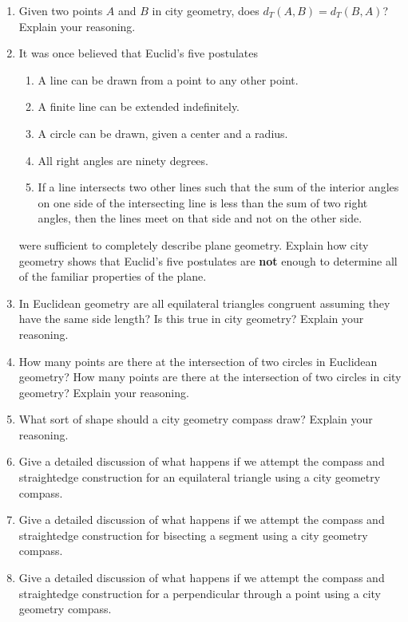 \begin{problems}
\begin{enumerate}
\item Given two points $A$ and $B$ in city geometry, does $d_T(A,B) =
  d_T(B,A)$? Explain your reasoning.
\item It was once believed that Euclid's five postulates
\begin{enumerate}
\item A line can be drawn from a point to any other point.
\item A finite line can be extended indefinitely.
\item A circle can be drawn, given a center and a radius.
\item All right angles are ninety degrees. 
\item If a line intersects two other lines such that the sum of the
  interior angles on one side of the intersecting line is less than
  the sum of two right angles, then the lines meet on that side and
  not on the other side.
\end{enumerate}
were sufficient to completely describe plane geometry.  Explain how
city geometry shows that Euclid's five postulates are \textbf{not}
enough to determine all of the familiar properties of the plane.

\item In Euclidean geometry are all equilateral triangles congruent
  assuming they have the same side length? Is this true in city
  geometry? Explain your reasoning.

\item How many points are there at the intersection of two circles in
  Euclidean geometry? How many points are there at the intersection of
  two circles in city geometry? Explain your reasoning.

\item What sort of shape should a city geometry compass draw? Explain
  your reasoning.

\item Give a detailed discussion of what happens if we attempt the
  compass and straightedge construction for an equilateral triangle
  using a city geometry compass.

\item Give a detailed discussion of what happens if we attempt the
  compass and straightedge construction for bisecting a segment using
  a city geometry compass.

\item Give a detailed discussion of what happens if we attempt the
  compass and straightedge construction for a perpendicular through a
  point using a city geometry compass.


\end{enumerate}
\end{problems}
